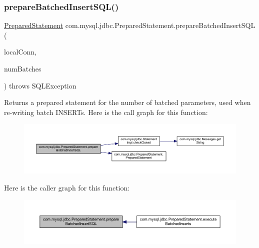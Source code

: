 \subsubsection{\texorpdfstring{prepare\+Batched\+Insert\+S\+Q\+L()}{prepareBatchedInsertSQL()}}
{\footnotesize\ttfamily \mbox{\hyperlink{classcom_1_1mysql_1_1jdbc_1_1_prepared_statement}{Prepared\+Statement}} com.\+mysql.\+jdbc.\+Prepared\+Statement.\+prepare\+Batched\+Insert\+S\+QL (\begin{DoxyParamCaption}\item[{\mbox{\hyperlink{interfacecom_1_1mysql_1_1jdbc_1_1_my_s_q_l_connection}{My\+S\+Q\+L\+Connection}}}]{local\+Conn,  }\item[{int}]{num\+Batches }\end{DoxyParamCaption}) throws S\+Q\+L\+Exception\hspace{0.3cm}{\ttfamily [protected]}}

Returns a prepared statement for the number of batched parameters, used when re-\/writing batch I\+N\+S\+E\+R\+Ts. Here is the call graph for this function\+:
\nopagebreak
\begin{figure}[H]
\begin{center}
\leavevmode
\includegraphics[width=350pt]{classcom_1_1mysql_1_1jdbc_1_1_prepared_statement_ad039caba8bbe065bb7b6a26a0f7a1f30_cgraph}
\end{center}
\end{figure}
Here is the caller graph for this function\+:
\nopagebreak
\begin{figure}[H]
\begin{center}
\leavevmode
\includegraphics[width=350pt]{classcom_1_1mysql_1_1jdbc_1_1_prepared_statement_ad039caba8bbe065bb7b6a26a0f7a1f30_icgraph}
\end{center}
\end{figure}
\mbox{\label{classcom_1_1mysql_1_1jdbc_1_1_prepared_statement_a38e323114d62ae7b8bee091841dcee5d}} 
